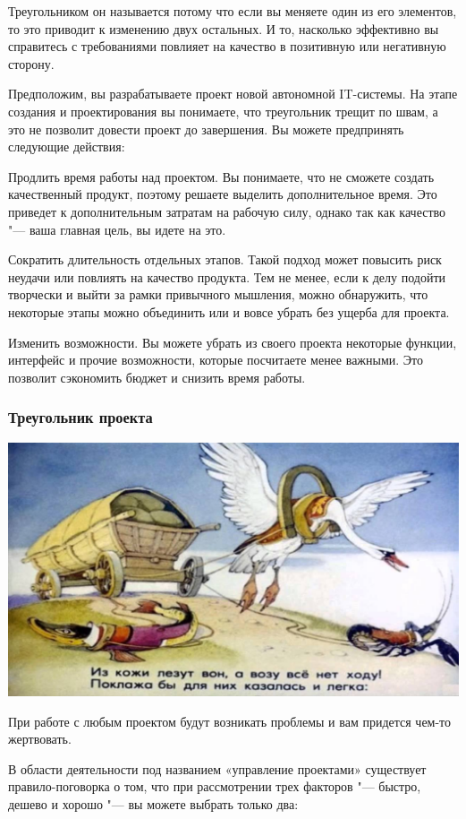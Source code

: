 \documentclass{../industrial-development}
\begin{document}
Треугольником он называется потому что если вы меняете один из его элементов, то это приводит к изменению двух остальных. И то, насколько эффективно вы справитесь с требованиями повлияет на качество в позитивную или негативную сторону.

Предположим, вы разрабатываете проект новой автономной IT-системы. На этапе создания и проектирования вы понимаете, что треугольник трещит по швам, а это не позволит довести проект до завершения. Вы можете предпринять следующие действия:

Продлить время работы над проектом. Вы понимаете, что не сможете создать качественный продукт, поэтому решаете выделить дополнительное время. Это приведет к дополнительным затратам на рабочую силу, однако так как качество "--- ваша главная цель, вы идете на это.

Сократить длительность отдельных этапов. Такой подход может повысить риск неудачи или повлиять на качество продукта. Тем не менее, если к делу подойти творчески и выйти за рамки привычного мышления, можно обнаружить, что некоторые этапы можно объединить или и вовсе убрать без ущерба для проекта.

Изменить возможности. Вы можете убрать из своего проекта некоторые функции, интерфейс и прочие возможности, которые посчитаете менее важными. Это позволит сэкономить бюджет и снизить время работы.


    \begin{frame} \frametitle{Треугольник проекта}
         \centerline{\includegraphics[width=1\textwidth]{start.jpg}}
    \end{frame}
    \lecturenotes

При работе с любым проектом будут возникать проблемы и вам придется чем-то жертвовать.

В области деятельности под названием «управление проектами» существует правило-поговорка о том, что при рассмотрении трех факторов "--- быстро, дешево и хорошо "--- вы можете выбрать только два:
\end{document}
